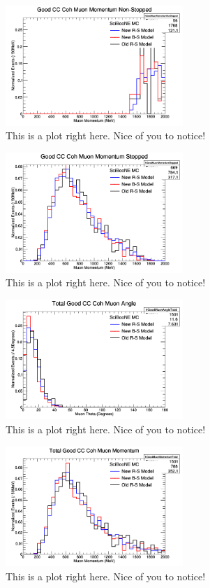 \documentclass[11pt]{article}
\begin{document}
\begin{figure}[H]
\centering
\includegraphics[width=0.6\textwidth]{NMCombinedPlotsImages/12-NMCombinedPlots.png}
\caption{This is a plot right here. Nice of you to notice!}
\end{figure}

\begin{figure}[H]
\centering
\includegraphics[width=0.6\textwidth]{NMCombinedPlotsImages/13-NMCombinedPlots.png}
\caption{This is a plot right here. Nice of you to notice!}
\end{figure}

\begin{figure}[H]
\centering
\includegraphics[width=0.6\textwidth]{NMCombinedPlotsImages/14-NMCombinedPlots.png}
\caption{This is a plot right here. Nice of you to notice!}
\end{figure}

\begin{figure}[H]
\centering
\includegraphics[width=0.6\textwidth]{NMCombinedPlotsImages/15-NMCombinedPlots.png}
\caption{This is a plot right here. Nice of you to notice!}
\end{figure}
\end{document}
